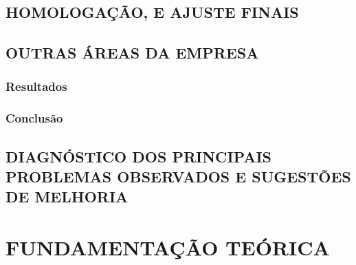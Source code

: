 \documentclass[
  12pt,				%
  openany,
  oneside,
  a4paper,			%
  english,			%
  brazil
]{article}
\numberwithin{figure}{section}
\numberwithin{table}{section}
\begin{document}
\subsection{HOMOLOGAÇÃO, E AJUSTE FINAIS}

\subsection{OUTRAS ÁREAS DA EMPRESA}



\subsubsection{Resultados}
\subsubsection{Conclusão}



\subsection{DIAGNÓSTICO DOS PRINCIPAIS PROBLEMAS OBSERVADOS E SUGESTÕES DE MELHORIA}







\section{FUNDAMENTAÇÃO TEÓRICA}
\end{document}
